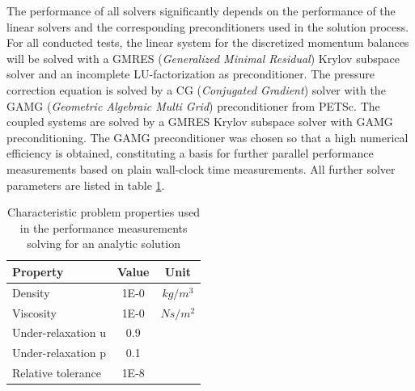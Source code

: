 The performance of all solvers significantly depends on the performance of the linear solvers and the corresponding preconditioners used in the solution process. For all conducted tests, the linear system for the discretized momentum balances will be solved with a GMRES (\emph{Generalized Minimal Residual}) \cite{saad86} Krylov subspace solver and an incomplete LU-factorization as preconditioner. The pressure correction equation is solved by a CG (\emph{Conjugated Gradient}) solver \cite{hestenes52} with the GAMG (\emph{Geometric Algebraic Multi Grid}) preconditioner from PETSc. The coupled systems are solved by a GMRES Krylov subspace solver with GAMG preconditioning. The GAMG preconditioner was chosen so that a high numerical efficiency is obtained, constituting a basis for further parallel performance measurements based on plain wall-clock time measurements. All further solver parameters are listed in table \ref{tab:performance}.

\begin{table}[h!]\centering
  \caption{Characteristic problem properties used in the performance measurements solving for an analytic solution}
  \begin{tabular}{lcc}\toprule
    Property & Value & Unit \\
    \midrule
    \rowcolor{black!20} Density    & 1E-0 & $kg/m^3$      \\
    \rowcolor{black!00} Viscosity  & 1E-0 & $Ns/m^2$  \\
    \rowcolor{black!00} Under-relaxation u & 0.9 &  \\
    \rowcolor{black!20} Under-relaxation p & 0.1 &  \\
    \rowcolor{black!00} Relative tolerance & 1E-8&
  \end{tabular}
  \label{tab:performance}
\end{table}
 
